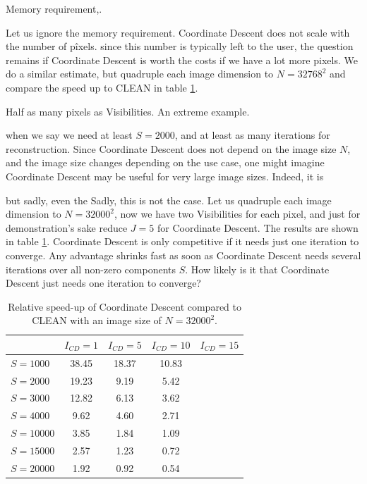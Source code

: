 Memory requirement,.


Let us ignore the memory requirement. Coordinate Descent does not scale with the number of pîxels. since this number is typically left to the user, the question remains if Coordinate Descent is worth the costs if we have a lot more pixels. We do a similar estimate, but quadruple each image dimension to $N=32768^2$ and compare the speed up to CLEAN in table \ref{res:cd:large:table}. 

Half as many pixels as Visibilities. An extreme example.


   when we say we need at least $S=2000$, and at least as many iterations for reconstruction. Since Coordinate Descent does not depend on the image size $N$, and the image size changes depending on the use case, one might imagine Coordinate Descent may be useful for very large image sizes. Indeed, it is

   but sadly, even the  Sadly, this is not the case. Let us quadruple each image dimension to $N=32000^2$, now we have two Visibilities for each pixel, and just for demonstration's sake reduce $J=5$ for Coordinate Descent. The results are shown in table \ref{res:cd:large:table}. Coordinate Descent is only competitive if it needs just one iteration to converge. Any advantage shrinks fast as soon as Coordinate Descent needs several iterations over all non-zero components $S$. How likely is it that Coordinate Descent just needs one iteration to converge?

\begin{table}[h!]
	\begin{center}
		\begin{tabular}{l|c|c|c|c} %
			& $I_{CD} = 1$ & $I_{CD} = 5$ &  $I_{CD} = 10$ &  $I_{CD} = 15$\\
			\hline
			$S=1000$ & 38.45 & 18.37 & 10.83 & \\
			$S=2000$ & 19.23 & 9.19 & 5.42 &  \\
			$S=3000$ & 12.82 & 6.13 & 3.62 &  \\
			$S=4000$ & 9.62 & 4.60 & 2.71 & \\
			\hline
			$S=10000$ & 3.85 & 1.84 & 1.09 &  \\
			$S=15000$ & 2.57 & 1.23 & 0.72 & \\
			$S=20000$ & 1.92 & 0.92 & 0.54 & \\
		\end{tabular}
		\caption{Relative speed-up of Coordinate Descent compared to CLEAN with an image size of $N=32000^2$. }
		\label{res:cd:large:table}
	\end{center}
\end{table}

